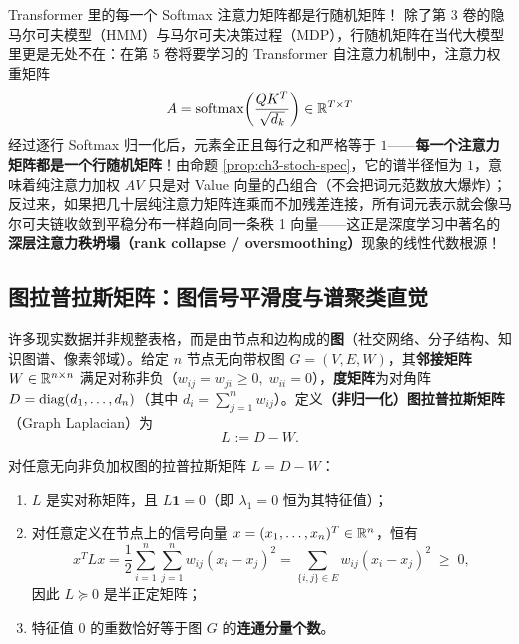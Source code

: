 \begin{insightBox}{Transformer 里的每一个 Softmax 注意力矩阵都是行随机矩阵！}
除了第 3 卷的隐马尔可夫模型（HMM）与马尔可夫决策过程（MDP），行随机矩阵在当代大模型里更是无处不在：在第 5 卷将要学习的 Transformer 自注意力机制中，注意力权重矩阵
\[
  A = \operatorname{softmax}\!\left(\frac{Q K^T}{\sqrt{d_k}}\right) \in \mathbb{R}^{T\times T}
\]
经过逐行 Softmax 归一化后，元素全正且每行之和严格等于 $1$——\textbf{每一个注意力矩阵都是一个行随机矩阵}！由命题 \ref{prop:ch3-stoch-spec}，它的谱半径恒为 $1$，意味着纯注意力加权 $AV$ 只是对 Value 向量的凸组合（不会把词元范数放大爆炸）；反过来，如果把几十层纯注意力矩阵连乘而不加残差连接，所有词元表示就会像马尔可夫链收敛到平稳分布一样趋向同一条秩 1 向量——这正是深度学习中著名的\textbf{深层注意力秩坍塌（rank collapse / oversmoothing）}现象的线性代数根源！
\end{insightBox}

\subsection{图拉普拉斯矩阵：图信号平滑度与谱聚类直觉}

许多现实数据并非规整表格，而是由节点和边构成的\textbf{图}（社交网络、分子结构、知识图谱、像素邻域）。给定 $n$ 节点无向带权图 $G = (V, E, W)$，其\textbf{邻接矩阵} $W \in \mathbb{R}^{n\times n}$ 满足对称非负（$w_{ij} = w_{ji} \ge 0,\; w_{ii} = 0$），\textbf{度矩阵}为对角阵 $D = \operatorname{diag}(d_1,\dots,d_n)$（其中 $d_i = \sum_{j=1}^n w_{ij}$）。定义\textbf{（非归一化）图拉普拉斯矩阵}（Graph Laplacian）为
\[
  L := D - W.
\]

\begin{thmBox}
\begin{proposition}[图拉普拉斯矩阵的半正定性与平滑度二次型]
\label{prop:ch3-laplacian}
对任意无向非负加权图的拉普拉斯矩阵 $L = D - W$：
\begin{enumerate}
  \item $L$ 是实对称矩阵，且 $L\mathbf{1} = 0$（即 $\lambda_1 = 0$ 恒为其特征值）；
  \item 对任意定义在节点上的信号向量 $x = (x_1,\dots,x_n)^T \in \mathbb{R}^n$，恒有
  \begin{equation}
    x^T L x = \frac{1}{2}\sum_{i=1}^n \sum_{j=1}^n w_{ij}(x_i - x_j)^2 = \sum_{\{i,j\}\in E} w_{ij}(x_i - x_j)^2 \;\ge\; 0, \label{eq:ch3-lap-quad}
  \end{equation}
  因此 $L \succeq 0$ 是半正定矩阵；
  \item 特征值 $0$ 的重数恰好等于图 $G$ 的\textbf{连通分量个数}。
\end{enumerate}
\end{proposition}
\end{thmBox}

